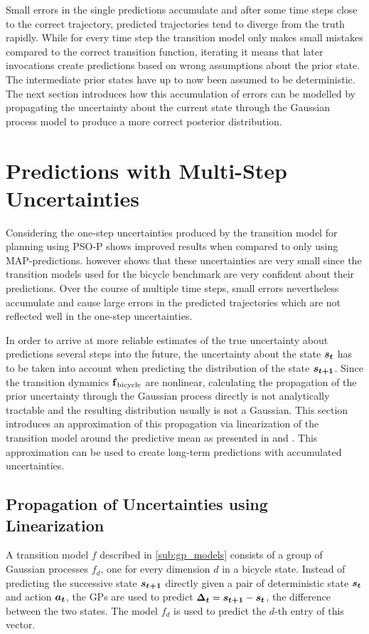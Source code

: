 Small errors in the single predictions accumulate and after some time steps close to the correct trajectory, predicted trajectories tend to diverge from the truth rapidly.
While for every time step the transition model only makes small mistakes compared to the correct transition function, iterating it means that later invocations create predictions based on wrong assumptions about the prior state.
The intermediate prior states have up to now been assumed to be deterministic.
The next section introduces how this accumulation of errors can be modelled by propagating the uncertainty about the current state through the Gaussian process model to produce a more correct posterior distribution.

\section{Predictions with Multi-Step Uncertainties}
\label{sub:ms_predictions}
Considering the one-step uncertainties produced by the transition model for planning using PSO-P shows improved results when compared to only using MAP-predictions.
 however shows that these uncertainties are very small since the transition models used for the bicycle benchmark are very confident about their predictions.
Over the course of multiple time steps, small errors nevertheless accumulate and cause large errors in the predicted trajectories which are not reflected well in the one-step uncertainties.

In order to arrive at more reliable estimates of the true uncertainty about predictions several steps into the future, the uncertainty about the state $\bm{s_t}$ has to be taken into account when predicting the distribution of the state $\bm{s_{t+1}}$.
Since the transition dynamics $\operatorname{\operatorname{\mathbf{f}}_{\text{bicycle}}}$ are nonlinear, calculating the propagation of the prior uncertainty through the Gaussian process directly is not analytically tractable and the resulting distribution usually is not a Gaussian.
This section introduces an approximation of this propagation via linearization of the transition model around the predictive mean as presented in \cite{ko_gp-bayesfilters:_2009} and \cite{ deisenroth_gaussian_2015}.
This approximation can be used to create long-term predictions with accumulated uncertainties.

\subsection{Propagation of Uncertainties using Linearization}
\label{sub:linearization}
A transition model $f$ described in \cref{sub:gp_models} consists of a group of Gaussian processes $f_d$, one for every dimension $d$ in a bicycle state.
Instead of predicting the successive state $\bm{s_{t+1}}$ directly given a pair of deterministic state $\bm{s_t}$ and action $\bm{a_t}$, the GPs are used to predict $\bm{\Delta_t} = \bm{s_{t+1}} - \bm{s_t}$, the difference between the two states.
The model $f_d$ is used to predict the $d$-th entry of this vector.

